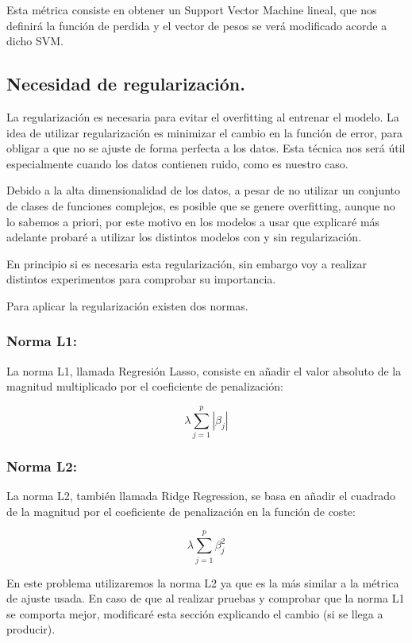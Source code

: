 \documentclass[12pt, spanish]{article}
\begin{document}
Esta métrica consiste en obtener un Support Vector Machine lineal, que nos definirá la función de perdida y el vector de pesos se verá modificado acorde a dicho SVM.

\subsection{Necesidad de regularización.}

La regularización es necesaria para evitar el overfitting al entrenar el modelo. La idea de utilizar regularización es minimizar el cambio en la función de error, para obligar a que no se ajuste de forma perfecta a los datos. Esta técnica nos será útil especialmente cuando los datos contienen ruido, como es nuestro caso.

Debido a la alta dimensionalidad de los datos, a pesar de no utilizar un conjunto de clases de funciones complejos, es posible que se genere overfitting, aunque no lo sabemos a priori, por este motivo en los modelos a usar que explicaré más adelante probaré a utilizar los distintos modelos con y sin regularización.

En principio si es necesaria esta regularización, sin embargo voy a realizar distintos experimentos para comprobar su importancia.

Para aplicar la regularización existen dos normas\cite{l1l2regularizacion}.


\subsubsection{Norma L1: }

La norma L1, llamada Regresión Lasso, consiste en añadir el valor absoluto de la magnitud multiplicado por el coeficiente de penalización:

$$ \lambda \sum_{j=1}^{p}{|\beta_j|} $$

\subsubsection{Norma L2:}

La norma L2, también llamada Ridge Regression, se basa en añadir el cuadrado de la magnitud por el coeficiente de penalización en la función de coste:

$$ \lambda \sum_{j=1}^{p}{\beta_j^2} $$


En este problema utilizaremos la norma L2 ya que es la más similar a la métrica de ajuste usada. En caso de que al realizar pruebas y comprobar que la norma L1 se comporta mejor, modificaré esta sección explicando el cambio (si se llega a producir).
\end{document}
